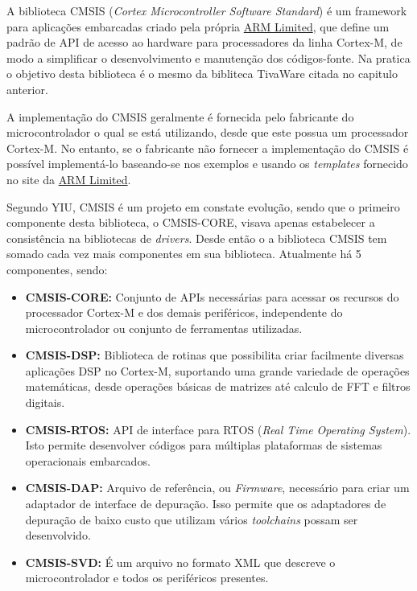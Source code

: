 A biblioteca CMSIS (\emph{Cortex Microcontroller Software Standard}) é  um framework para aplicações embarcadas criado pela própria \href{http://infocenter.arm.com/help/index.jsp}{ARM Limited}, que define um padrão de API de acesso ao hardware para processadores da linha Cortex-M, de modo a simplificar o desenvolvimento e manutenção dos códigos-fonte. Na pratica o objetivo desta biblioteca é o mesmo da bibliteca TivaWare citada no capitulo anterior.

A implementação do CMSIS geralmente é fornecida pelo fabricante do microcontrolador o qual se está utilizando, desde que este possua um processador Cortex-M. No entanto, se o fabricante não fornecer a implementação do CMSIS é possível implementá-lo baseando-se nos exemplos e usando os \emph{templates} fornecido no site da \href{http://www.arm.com/products/processors/cortex-m/cortex-microcontroller-software-interface-standard.php}{ARM Limited}.

Segundo YIU\cite{ARMGUIDE}, CMSIS é um projeto em constate evolução, sendo que o primeiro componente desta biblioteca, o  CMSIS-CORE, visava apenas estabelecer a consistência na bibliotecas de \emph{drivers}. Desde então o a biblioteca CMSIS tem somado cada vez mais componentes em sua biblioteca. Atualmente há 5 componentes, sendo: 

\begin{itemize}
	\item \textbf{CMSIS-CORE:} Conjunto de APIs necessárias para acessar os recursos do processador Cortex-M e dos demais periféricos, independente do microcontrolador ou conjunto de ferramentas utilizadas.
	
	\item \textbf{CMSIS-DSP:} Biblioteca de rotinas que possibilita criar facilmente diversas aplicações DSP no Cortex-M, suportando uma grande variedade de operações matemáticas, desde operações básicas de matrizes até calculo de FFT e filtros digitais. 
	
	\item \textbf{CMSIS-RTOS:} API de interface para RTOS (\emph{Real Time Operating System}). Isto permite desenvolver códigos para múltiplas plataformas de sistemas operacionais embarcados.
	
	\item \textbf{CMSIS-DAP:} Arquivo de referência, ou \emph{Firmware}, necessário para criar um adaptador de interface de depuração. Isso permite que os adaptadores de depuração de baixo custo que utilizam vários \emph{toolchains} possam ser desenvolvido.
	
	\item \textbf{CMSIS-SVD:} É um arquivo no formato XML que descreve o microcontrolador e todos os periféricos presentes.
\end{itemize}

